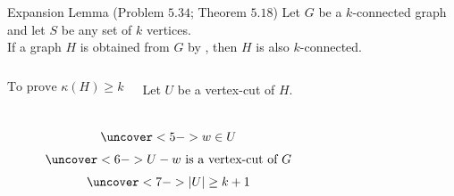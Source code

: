 
\begin{frame}{}
  \begin{exampleblock}{Expansion Lemma (Problem $5.34$; Theorem $5.18$)}
    Let $G$ be a $k$-connected graph and let $S$ be any set of $k$ vertices. \\[8pt]
    If a graph $H$ is obtained from $G$ by ,
    then $H$ is also $k$-connected.
  \end{exampleblock}

  \vspace{0.80cm}
\end{frame}

\begin{frame}{}
  \begin{columns}
      \[
	\text{To prove } \kappa(H) \ge k
      \]

      \pause
      \begin{center}
	Let $U$ be a vertex-cut of $H$. \\[5pt]
      \end{center}
  \end{columns}

  \pause
  \vspace{0.50cm}
  \begin{columns}[t]
      \begin{center}
      \end{center}

      \begin{center}
      \end{center}

      \vspace{-0.60cm}
      \begin{gather*}
	\uncover<5->{ w \in U } \\[3pt]
	\uncover<6->{ U - w \text{ is a vertex-cut of } G } \\[3pt]
	\uncover<7->{ |U| \ge k + 1 }
      \end{gather*}
  \end{columns}
\end{frame}

